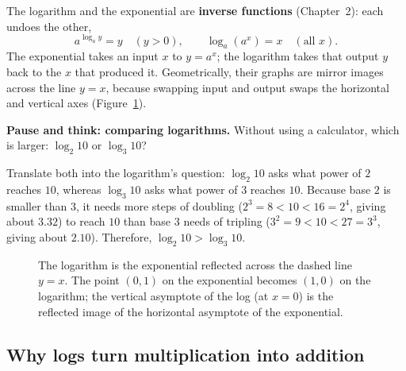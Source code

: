 The logarithm and the exponential are \textbf{inverse functions} (Chapter~2): each undoes the other,
\[
a^{\log_a y} = y \quad (y>0), \qquad \log_a(a^x) = x \quad (\text{all } x).
\]
The exponential takes an input $x$ to $y = a^x$; the logarithm takes that output $y$ back to the $x$ that produced it. Geometrically, their graphs are mirror images across the line $y=x$, because swapping input and output swaps the horizontal and vertical axes (Figure~\ref{ch03:fig-log-reflect}).

\begin{recoverybox}
\textbf{Pause and think: comparing logarithms.} Without using a calculator, which is larger: $\log_2 10$ or $\log_3 10$?

Translate both into the logarithm's question: $\log_2 10$ asks what power of $2$ reaches $10$, whereas $\log_3 10$ asks what power of $3$ reaches $10$. Because base $2$ is smaller than $3$, it needs more steps of doubling ($2^3 = 8 < 10 < 16 = 2^4$, giving about $3.32$) to reach $10$ than base $3$ needs of tripling ($3^2 = 9 < 10 < 27 = 3^3$, giving about $2.10$). Therefore, $\log_2 10 > \log_3 10$.
\end{recoverybox}

\begin{figure}[htbp]
\centering
{}
\caption{The logarithm is the exponential reflected across the dashed line $y=x$. The point $(0,1)$ on the exponential becomes $(1,0)$ on the logarithm; the vertical asymptote of the log (at $x=0$) is the reflected image of the horizontal asymptote of the exponential.}
\label{ch03:fig-log-reflect}
\end{figure}

\subsection{Why logs turn multiplication into addition}

